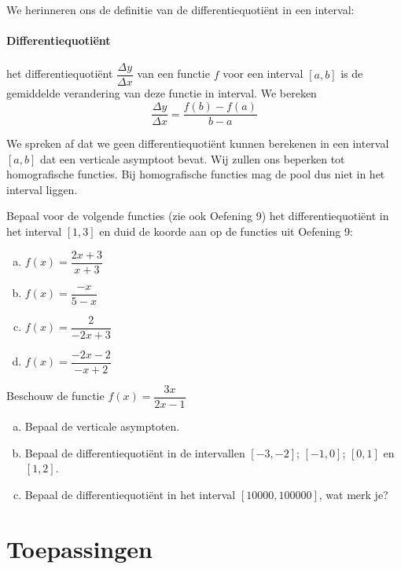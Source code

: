 \documentclass[12pt]{article}
\begin{document}
We herinneren ons de definitie van de differentiequotiënt in een interval:
\paragraph{Differentiequotiënt}
\begin{mdframed}
het differentiequotiënt $\dfrac{\Delta y}{\Delta x}$ van een functie $f$ voor een interval $[a, b]$ is de gemiddelde verandering van deze functie in interval. We bereken
$$\dfrac{\Delta y}{\Delta x}=\dfrac{f(b)-f(a)}{b-a}$$
\end{mdframed}

We spreken af dat we geen differentiequotiënt kunnen berekenen in een interval $[a,b]$ dat een verticale asymptoot bevat. Wij zullen ons beperken tot homografische functies. Bij homografische functies mag de pool dus niet in het interval liggen.

\begin{oefening}
Bepaal voor de volgende functies (zie ook Oefening 9) het differentiequotiënt in het interval $[1,3]$ en duid de koorde aan op de functies uit Oefening 9:\\
\begin{enumerate}[(a)]
  \itemsep1em
  \item $f(x)=\dfrac{2x+3}{x+3}$
  \item $f(x)=\dfrac{-x}{5-x}$
  \item $f(x)=\dfrac{2}{-2x+3}$
  \item $f(x)=\dfrac{-2x-2}{-x+2}$
\end{enumerate}
\end{oefening}

\begin{oefening}
Beschouw de functie $f(x)=\dfrac{3x}{2x-1}$
\begin{enumerate}[(a)]
  \item Bepaal de verticale asymptoten.
  \item Bepaal de differentiequotiënt in de intervallen $[-3,-2]$; $[-1,0]$; $[0,1]$ en $[1,2]$.
  \item Bepaal de differentiequotiënt in het interval $[10000, 100000]$, wat merk je?
\end{enumerate}
\end{oefening}

\pagebreak
\section{Toepassingen}
\end{document}
